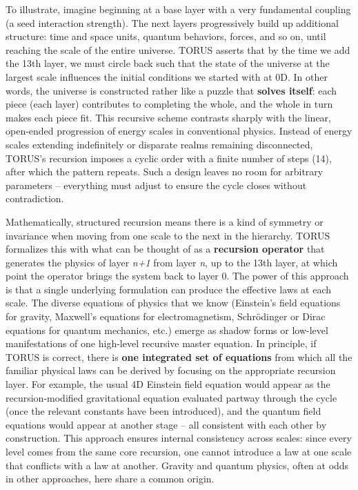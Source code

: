 \documentclass[
]{article}
\begin{document}
To illustrate, imagine beginning at a base layer with a very fundamental
coupling (a seed interaction strength). The next layers progressively
build up additional structure: time and space units, quantum behaviors,
forces, and so on, until reaching the scale of the entire universe.
TORUS asserts that by the time we add the 13th layer, we must circle
back such that the state of the universe at the largest scale influences
the initial conditions we started with at 0D. In other words, the
universe is constructed rather like a puzzle that \textbf{solves
itself}: each piece (each layer) contributes to completing the whole,
and the whole in turn makes each piece fit. This recursive scheme
contrasts sharply with the linear, open-ended progression of energy
scales in conventional physics. Instead of energy scales extending
indefinitely or disparate realms remaining disconnected, TORUS's
recursion imposes a cyclic order with a finite number of steps (14),
after which the pattern repeats. Such a design leaves no room for
arbitrary parameters -- everything must adjust to ensure the cycle
closes without contradiction.

Mathematically, structured recursion means there is a kind of symmetry
or invariance when moving from one scale to the next in the hierarchy.
TORUS formalizes this with what can be thought of as a \textbf{recursion
operator} that generates the physics of layer \emph{n+1} from layer
\emph{n}, up to the 13th layer, at which point the operator brings the
system back to layer 0. The power of this approach is that a single
underlying formulation can produce the effective laws at each scale. The
diverse equations of physics that we know (Einstein's field equations
for gravity, Maxwell's equations for electromagnetism, Schrödinger or
Dirac equations for quantum mechanics, etc.) emerge as shadow forms or
low-level manifestations of one high-level recursive master equation. In
principle, if TORUS is correct, there is \textbf{one integrated set of
equations} from which all the familiar physical laws can be derived by
focusing on the appropriate recursion layer. For example, the usual 4D
Einstein field equation would appear as the recursion-modified
gravitational equation evaluated partway through the cycle (once the
relevant constants have been introduced), and the quantum field
equations would appear at another stage -- all consistent with each
other by construction. This approach ensures internal consistency across
scales: since every level comes from the same core recursion, one cannot
introduce a law at one scale that conflicts with a law at another.
Gravity and quantum physics, often at odds in other approaches, here
share a common origin.
\end{document}
